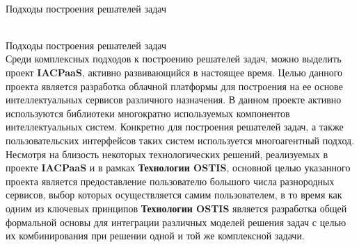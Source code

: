 \begin{frame}{\\Подходы построения решателей задач}
	\topline
	\justifying
	\vspace*{\fill}\\
	\footnotesize{
		\begin{SCn}
			\begin{scnindent}
			\end{scnindent}
		\end{SCn}
	}
\end{frame}

\begin{frame}{\\Подходы построения решателей задач}
	\topline
	\justifying
	\vspace*{\fill}\\
	\small{
		Среди комплексных подходов к построению решателей задач, можно выделить проект \textbf{IACPaaS}, активно развивающийся в настоящее время. Целью данного проекта является разработка облачной платформы для построения на ее основе интеллектуальных сервисов различного назначения. В данном проекте активно используются библиотеки многократно используемых компонентов интеллектуальных систем. Конкретно для построения решателей задач, а также пользовательских интерфейсов таких систем используется многоагентный подход. Несмотря на близость некоторых технологических решений, реализуемых в проекте 	\textbf{IACPaaS} и в рамках \textbf{Технологии OSTIS}, основной целью указанного проекта является предоставление пользователю большого числа разнородных сервисов, выбор которых осуществляется самим пользователем, в то время как одним из ключевых принципов 	\textbf{Технологии OSTIS} является разработка общей формальной основы для интеграции различных моделей решения задач с целью их комбинирования при решении одной и той же комплексной задачи.	
	}
\end{frame}

